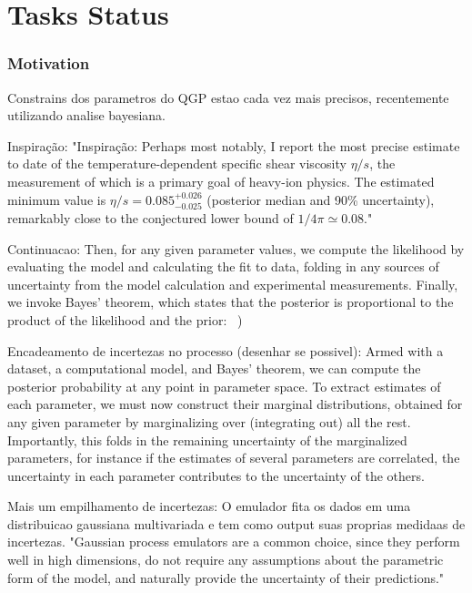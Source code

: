 \section{Tasks Status} %


\begin{frame}
  \frametitle{Motivation}

Constrains dos parametros do QGP estao cada vez mais precisos, recentemente utilizando analise bayesiana.

Inspiração: "Inspiração: Perhaps most notably, I report the most precise estimate to date
of the temperature-dependent specific shear viscosity $\eta/s$, the measurement
of which is a primary goal of heavy-ion physics. The estimated minimum value is
$\eta/s = 0.085^{+0.026}_{-0.025}$ (posterior median and 90\% uncertainty),
remarkably close to the conjectured lower bound of $1/4\pi \simeq 0.08$."~\cite{bernhard_bayesian_2018}


Continuacao: Then, for any given parameter values, we compute the likelihood by evaluating the model and calculating the fit to data, folding in any sources of uncertainty from the model calculation and experimental measurements. Finally, we invoke Bayes’ theorem, which states that the posterior is proportional to the product of the likelihood and the prior: ~\cite{bernhard_bayesian_2018})

Encadeamento de incertezas no processo (desenhar se possivel): Armed with a dataset, a computational model, and Bayes’ theorem, we can compute the posterior probability at any point in parameter space. To extract estimates of each parameter, we must now construct their marginal distributions, obtained for any given parameter by marginalizing over (integrating out) all the rest. Importantly, this folds in the remaining uncertainty of the marginalized parameters, for instance if the estimates of several parameters are correlated, the uncertainty in each parameter contributes to the uncertainty of the others.

Mais um empilhamento de incertezas: O emulador fita os dados em uma distribuicao gaussiana multivariada e tem como output suas proprias medidaas de incertezas. "Gaussian process emulators are a common choice, since they perform well in high dimensions, do not require any assumptions about the parametric form of the model, and naturally provide the uncertainty of their predictions."~\cite{bernhard_bayesian_2018}  
\end{frame}


